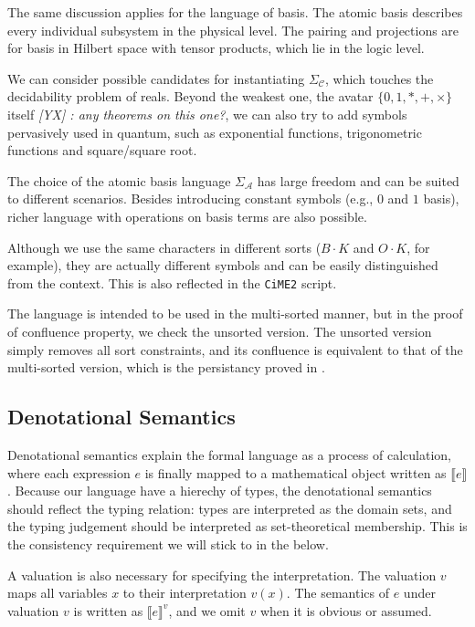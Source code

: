 \documentclass[manuscript, review, timestamp]{acmart}
\newcommand{\yx}[1]{\textit{\color{blue}[YX] : #1}}
\newcommand*{\sem}[1]{\llbracket #1 \rrbracket}
\begin{document}
The same discussion applies for the language of basis. The atomic basis describes every individual subsystem in the physical level. The pairing and projections are for basis in Hilbert space with tensor products, which lie in the logic level.

We can consider possible candidates for instantiating $\Sigma_\mathcal{C}$, which touches the decidability problem of reals. Beyond the weakest one, the avatar $\{0, 1, *, +, \times\}$ itself \yx{any theorems on this one?}, we can also try to add symbols pervasively used in quantum, such as exponential functions, trigonometric functions and square/square root.

The choice of the atomic basis language $\Sigma_\mathcal{A}$ has large freedom and can be suited to different scenarios. Besides introducing constant symbols (e.g., $0$ and $1$ basis), richer language with operations on basis terms are also possible. 


Although we use the same characters in different sorts ($B \cdot K$ and $O \cdot K$, for example), they are actually different symbols and can be easily distinguished from the context. This is also reflected in the \texttt{CiME2} script. 

The language is intended to be used in the multi-sorted manner, but in the proof of confluence property, we check the unsorted version. The unsorted version simply removes all sort constraints, and its confluence is equivalent to that of the multi-sorted version, which is the persistancy proved in \cite{Aoto1997}.



\subsection{Denotational Semantics}

Denotational semantics explain the formal language as a process of calculation, where each expression $e$ is finally mapped to a mathematical object written as $\sem{e}$.
Because our language have a hierechy of types, the denotational semantics should reflect the typing relation: types are interpreted as the domain sets, and the typing judgement should be interpreted as set-theoretical membership. This is the consistency requirement we will stick to in the below.

A valuation is also necessary for specifying the interpretation. The valuation $v$ maps all variables $x$ to their interpretation $v(x)$. The semantics of $e$ under valuation $v$ is written as $\sem{e}^v$, and we omit $v$ when it is obvious or assumed.
\end{document}
